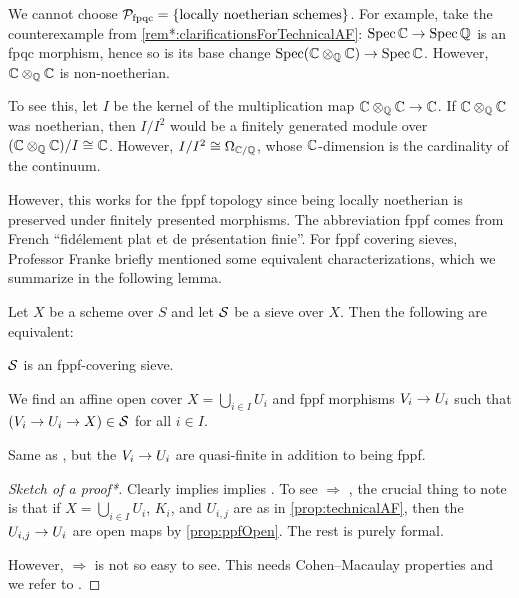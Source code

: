 \begin{rem}
	\begin{alphanumerate}
		\item We cannot choose $\mathcal{P}_{\mathrm{fpqc}}=\left\{\text{locally noetherian schemes}\right\}$. For example, take the counterexample from \cref{rem*:clarificationsForTechnicalAF}: $\Spec\IC\morphism \Spec\IQ$ is an fpqc morphism, hence so is its base change $\Spec(\IC\otimes_\IQ\IC)\morphism \Spec\IC$. However, $\mathbb{C}\otimes_{\mathbb{Q}}\mathbb{C}$ is non-noetherian. 
		
		To see this, let $I$ be the kernel of the multiplication map $\IC\otimes_\IQ\IC\morphism \IC$. If $\mathbb{C}\otimes_{\mathbb{Q}}\mathbb{C}$ was noetherian, then $I/I^2$ would be a finitely generated module over $(\mathbb{C}\otimes_{\mathbb{Q}}\mathbb{C})/I\cong \mathbb{C}$. However, $I/I^2\cong \Omega_{\mathbb{C}/\mathbb{Q}}$, whose $\mathbb{C}$-dimension is the cardinality of the continuum.
		\item However, this works for the fppf topology since being locally noetherian is preserved under finitely presented morphisms. The abbreviation fppf comes from French \enquote{fidélement plat et de présentation finie}. For fppf covering sieves, Professor Franke briefly mentioned some equivalent characterizations, which we summarize in the following lemma. 
	\end{alphanumerate}
\end{rem}
\begin{lem*}\label{lem*:fppf}
	Let $X$ be a scheme over $S$ and let $\mathcal{S}$ be a sieve over $X$. Then the following are equivalent:
	\begin{alphanumerate}
		\item $\mathcal{S}$ is an fppf-covering sieve.
		\item We find an affine open cover $X=\bigcup_{i\in I}U_i$ and fppf morphisms $V_i\morphism U_i$ such that $(V_i\morphism U_i\morphism X)\in \Ss$ for all $i\in I$.
		\item Same as , but the $V_i\morphism U_i$ are quasi-finite in addition to being fppf.
	\end{alphanumerate}
\end{lem*}
\begin{proof}[Sketch of a proof\textup{*}]
	Clearly  implies  implies . To see  $\Rightarrow$ , the crucial thing to note is that if $X=\bigcup_{i\in I}U_i$, $K_i$, and $U_{i,j}$ are as in \cref{prop:technicalAF}, then the $U_{i,j}\morphism U_i$ are open maps by \cref{prop:ppfOpen}. The rest is purely formal.
	
	However,  $\Rightarrow$  is not so easy to see. This needs Cohen--Macaulay properties and we refer to \cite[]{stacks-project}.
\end{proof}
